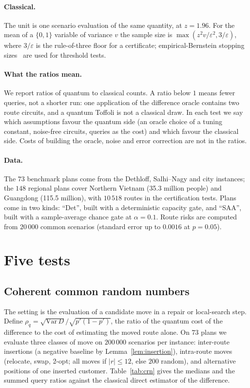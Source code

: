 \documentclass[pdflatex,sn-mathphys-num]{sn-jnl}
\theoremstyle{thmstyleone}
\theoremstyle{thmstyletwo}
\begin{document}
\paragraph{Classical.} The unit is one scenario evaluation of the same quantity, at $z=1.96$. For the mean of a $\{0,1\}$ variable of variance $v$ the sample size is $\max(z^2v/\varepsilon^2,3/\varepsilon)$, where $3/\varepsilon$ is the rule-of-three floor for a certificate; empirical-Bernstein stopping sizes~\cite{Audibert2009,Maurer2009} are used for threshold tests.

\paragraph{What the ratios mean.} We report ratios of quantum to classical counts. A ratio below $1$ means fewer queries, not a shorter run: one application of the difference oracle contains two route circuits, and a quantum Toffoli is not a classical draw. In each test we say which assumptions favour the quantum side (an oracle choice of a tuning constant, noise-free circuits, queries as the cost) and which favour the classical side. Costs of building the oracle, noise and error correction are not in the ratios.

\paragraph{Data.} The $73$ benchmark plans come from the Dethloff, Salhi--Nagy and city instances; the $148$ regional plans cover Northern Vietnam (35.3 million people) and Guangdong (115.5 million), with $10\,518$ routes in the certification tests. Plans come in two kinds: ``Det'', built with a deterministic capacity gate, and ``SAA'', built with a sample-average chance gate at $\alpha=0.1$. Route risks are computed from $20\,000$ common scenarios (standard error up to $0.0016$ at $p=0.05$).

\section{Five tests}\label{sec:tests}

\subsection{Coherent common random numbers}\label{sec:crn}
The setting is the evaluation of a candidate move in a repair or local-search step. Define $\rho_q=\sqrt{\mathrm{Var}\,D}/\sqrt{p'(1-p')}$, the ratio of the quantum cost of the difference to the cost of estimating the moved route alone. On $73$ plans we evaluate three classes of move on $200\,000$ scenarios per instance: inter-route insertions (a negative baseline by Lemma~\ref{lem:insertion}), intra-route moves (relocate, swap, 2-opt; all moves if $|r|\le12$, else $200$ random), and alternative positions of one inserted customer. Table~\ref{tab:crn} gives the medians and the summed query ratios against the classical direct estimator of the difference.
\end{document}
